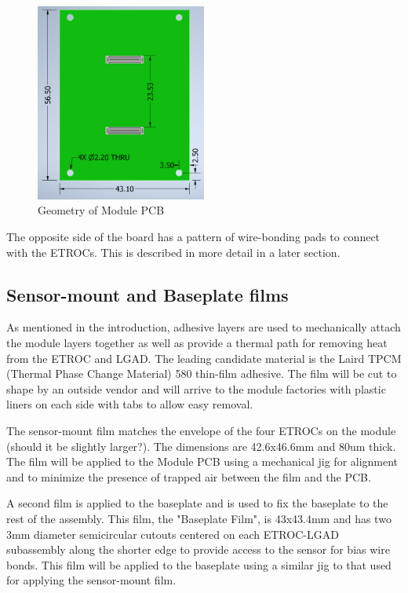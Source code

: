 \documentclass[10pt]{datasheet}
\begin{document}
\begin{figure}[h]
	\centering
	\includegraphics[width=0.5\textwidth,angle=-90]{figures/module_pcb.png}
	\caption{Geometry of Module PCB}
	\label{fig:module-pcb}	
\end{figure}

The opposite side of the board has a pattern of wire-bonding pads to connect with the ETROCs. This is described in more detail in a later section.


\subsection{Sensor-mount and Baseplate films}

As mentioned in the introduction, adhesive layers are used to mechanically attach the module layers together as well as provide a thermal path for removing heat from the ETROC and LGAD. The leading candidate material is the Laird TPCM (Thermal Phase Change Material) 580 thin-film adhesive. The film will be cut to shape by an outside vendor and will arrive to the module factories with plastic liners on each side with tabs to allow easy removal.

The sensor-mount film matches the envelope of the four ETROCs on the module (should it be slightly larger?). The dimensions are 42.6x46.6mm and 80um thick. The film will be applied to the Module PCB using a mechanical jig for alignment and to minimize the presence of trapped air between the film and the PCB.

A second film is applied to the baseplate and is used to fix the baseplate to the rest of the assembly. This film, the "Baseplate Film", is 43x43.4mm and has two 3mm diameter semicircular cutouts centered on each ETROC-LGAD subassembly along the shorter edge to provide access to the sensor for bias wire bonds. This film will be applied to the baseplate using a similar jig to that used for applying the sensor-mount film. 
\end{document}
